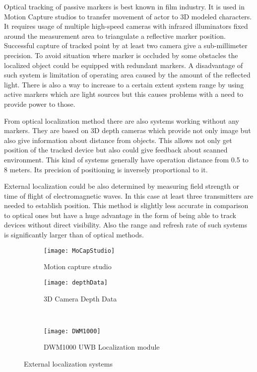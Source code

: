 \documentclass[printmode,en]{mgr}
\begin{document}
Optical tracking of passive markers \cite{MoCap} is best known in film industry. It is used in Motion Capture studios to transfer movement of actor to 3D modeled characters. It requires usage of multiple high-speed cameras with infrared illuminators fixed around the measurement area to triangulate a reflective marker position. Successful capture of tracked point by at least two camera give a sub-millimeter precision. To avoid situation where marker is occluded by some obstacles the localized object could be equipped with redundant markers. A disadvantage of such system is limitation of operating area caused by the amount of the reflected light. There is also a way to increase to a certain extent system range by using active markers which are light sources but this causes problems with a need to provide power to those.

From optical localization method there are also systems working without any markers. They are based on 3D depth cameras which provide not only image but also give information about distance from objects. This allows not only get position of the tracked device but also could give feedback about scanned environment. This kind of systems generally have operation distance from 0.5 to 8 meters. Its precision of positioning is inversely proportional to it.

External localization could be also determined by measuring field strength or time of flight of electromagnetic waves. In this case at least three transmitters are needed to establish position. This method is slightly less accurate in comparison to optical ones but have a huge advantage in the form of being able to track devices without direct visibility. Also the range and refresh rate of such systems is significantly larger than of optical methods.

\begin{figure}[!ht]
\centering
\begin{subfigure}{.45\textwidth}
  \centering
  \texttt{[image: MoCapStudio]}
  \caption{Motion capture studio \cite{MoCapStudio}}
  \label{fig:MoCapStudio}
\end{subfigure}
\begin{subfigure}{.45\textwidth}
  \centering
  \texttt{[image: depthData]}
  \caption{3D Camera Depth Data \cite{depthData}}
  \label{fig:depthData}
\end{subfigure}\\
\begin{subfigure}{.5\textwidth}
  \centering
  \texttt{[image: DWM1000]}
  \caption{DWM1000 UWB Localization module \cite{DWM1000}}
  \label{fig:DWM1000}
\end{subfigure}
\caption{External localization systems}
\label{fig:externalDevicesLocalization}
\end{figure}
\end{document}
